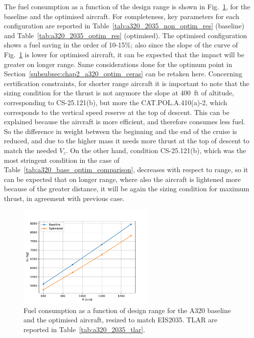 The fuel consumption as a function of the design range is shown in Fig.~\ref{fig:a320_2035_optim_comp}, for the baseline and the optimised aircraft. 
For completeness, key parameters for each configuration are reported in Table~\ref{tab:a320_2035_non_optim_res} (baseline) and Table~\ref{tab:a320_2035_optim_res} (optimised). 
The optimised configuration shows a fuel saving in the order of 10-15\%; also since the slope of the curve of Fig.~\ref{fig:a320_2035_optim_comp} is lower for optimised aircraft, it can be expected that the impact will be greater on longer range. 
Same considerations done for the optimum point in Section~\ref{subsubsec:chap2_a320_optim_ceras} can be retaken here. 
Concerning certification constraints, for shorter range aircraft it is important to note that the sizing condition for the thrust is not anymore the slope at 400~ft of altitude, corresponding to CS-25.121(b), but more the CAT.POL.A.410(a)-2, which corresponds to the vertical speed reserve at the top of descent. 
This can be explained because the aircraft is more efficient, and therefore consumes less fuel. 
So the difference in weight between the beginning and the end of the cruise is reduced, and due to the higher mass it needs more thrust at the top of descent to match the needed $V_z$. 
On the other hand, condition CS-25.121(b), which was the most stringent condition in the case of Table~\ref{tab:a320_base_optim_comparison}, decreases with respect to range, so it can be expected that on longer range, where also the aircraft is lightened more because of the greater distance, it will be again the sizing condition for maximum thrust, in agreement with previous case. 
\begin{figure}[!h]
	\centering
	\includegraphics[keepaspectratio, width=0.6\textwidth]{images/chap2/fast_base_optim_comp}
	\caption{Fuel consumption as a function of design range for the A320 baseline and the optimised aircraft, resized to match EIS2035. TLAR are reported in Table~\ref{tab:a320_2035_tlar}. }
	\label{fig:a320_2035_optim_comp}
\end{figure}

